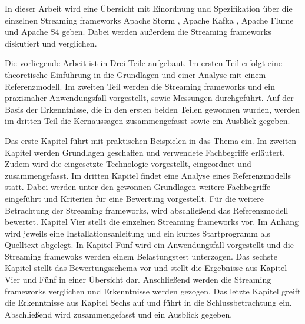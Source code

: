 In dieser Arbeit wird eine Übersicht mit Einordnung und Spezifikation über die einzelnen Streaming frameworks Apache Storm , Apache Kafka , Apache Flume  und Apache S4  geben. Dabei werden außerdem die Streaming frameworks diskutiert und verglichen. 


Die vorliegende Arbeit ist in Drei Teile aufgebaut. Im ersten Teil erfolgt eine theoretische Einführung in die Grundlagen und einer Analyse mit einem Referenzmodell. Im zweiten Teil werden die Streaming frameworks und ein praxisnaher Anwendungsfall vorgestellt, sowie Messungen durchgeführt. 
Auf der Basis der Erkenntnisse, die in den ersten beiden Teilen gewonnen wurden, werden im dritten Teil die Kernaussagen zusammengefasst sowie ein Ausblick gegeben.

Das erste Kapitel führt mit praktischen Beispielen in das Thema ein. Im zweiten Kapitel werden Grundlagen geschaffen und verwendete Fachbegriffe erläutert. Zudem wird die eingesetzte Technologie vorgestellt, eingeordnet und zusammengefasst. 
Im dritten Kapitel findet eine Analyse eines Referenzmodells statt. Dabei werden unter den gewonnen Grundlagen weitere Fachbegriffe eingeführt und Kriterien für eine Bewertung vorgestellt. Für die weitere Betrachtung der Streaming frameworks, wird abschließend das Referenzmodell bewertet.
Kapitel Vier stellt die einzelnen Streaming frameworks vor. Im Anhang wird jeweils eine Installationsanleitung und ein kurzes Startprogramm als Quelltext abgelegt.
In Kapitel Fünf wird ein Anwendungsfall vorgestellt und die Streaming framewoks werden einem Belastungstest unterzogen.
Das sechste Kapitel stellt das Bewertungsschema vor und stellt die Ergebnisse aus Kapitel Vier und Fünf in einer Übersicht dar. Anschließend werden die Streaming frameworks verglichen und Erkenntnisse werden gezogen.
Das letzte Kapitel greift die Erkenntnisse aus Kapitel Sechs auf und führt in die Schlussbetrachtung ein. Abschließend wird zusammengefasst und ein Ausblick gegeben.